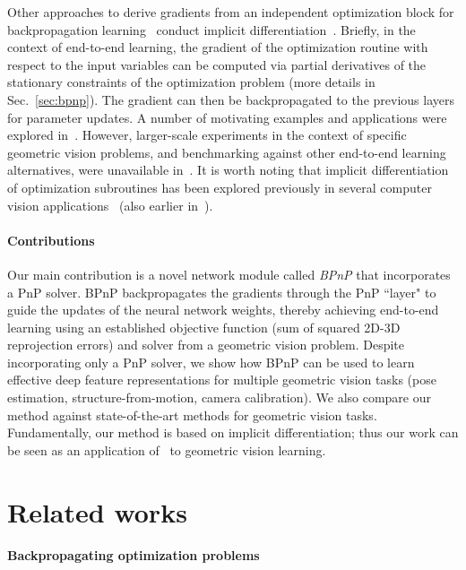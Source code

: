 \documentclass[10pt,twocolumn,letterpaper]{article}
\begin{document}
Other approaches to derive gradients from an independent optimization block for backpropagation learning~\cite{gould2016differentiating,amos2017optnet} conduct implicit differentiation~\cite[Chap.~8]{binmore83}. Briefly, in the context of end-to-end learning, the gradient of the optimization routine with respect to the input variables can be computed via partial derivatives of the stationary constraints of the optimization problem (more details in Sec.~\ref{sec:bpnp}). The gradient can then be backpropagated to the previous layers for parameter updates. A number of motivating examples and applications were explored in~\cite{gould2016differentiating,amos2017optnet}. However, larger-scale experiments in the context of specific geometric vision problems, and benchmarking against other end-to-end learning alternatives, were unavailable in~\cite{gould2016differentiating,amos2017optnet}. It is worth noting that implicit differentiation of optimization subroutines has been explored previously in several computer vision applications~\cite{tappen07,eriksson10,schmidt14} (also earlier in~\cite[Chap.~5]{faugeras93}).

\paragraph{Contributions}

Our main contribution is a novel network module called \emph{BPnP} that incorporates a PnP solver. BPnP backpropagates the gradients through the PnP ``layer" to guide the updates of the neural network weights, thereby achieving end-to-end learning using an established objective function (sum of squared 2D-3D reprojection errors) and solver from a geometric vision problem. Despite incorporating only a PnP solver, we show how BPnP can be used to learn effective deep feature representations for multiple geometric vision tasks (pose estimation, structure-from-motion, camera calibration). We also compare our method against state-of-the-art methods for geometric vision tasks. Fundamentally, our method is based on implicit differentiation; thus our work can be seen as an application of~\cite{gould2016differentiating,amos2017optnet} to geometric vision learning.




\section{Related works}


\paragraph{Backpropagating optimization problems}
\end{document}
